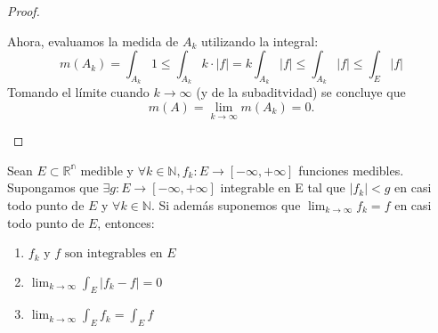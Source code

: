 \begin{proof}
\begin{enumerate}
              Ahora, evaluamos la medida de $ A_k $ utilizando la integral: $$ m(A_k) =
                  \int_{A_k} 1 \leq \int_{A_k} k \cdot |f| = k \int_{A_k} |f| \leq \int_{A_k} |f|
                  \leq \int_E |f|$$ Tomando el límite cuando $ k \to \infty $ (y de la
              subaditvidad) se concluye que $$ m(A) = \lim_{k \to \infty} m(A_k) = 0. $$
    \end{enumerate}
\end{proof}
\begin{teorema}
    Sean $E \subset \mathbb{R^n}$ medible y $\forall k \in \mathbb{N}, f_k: E \to [-\infty, +\infty]$ funciones medibles. Supongamos que $\exists g: E \to [-\infty, +\infty]$ integrable en E tal que $|f_k| < g$ en casi todo punto de $E$ y $\forall k \in \mathbb{N}$. Si además suponemos que $\lim_{k \to \infty} f_k = f$ en casi todo punto de $E$, entonces:
    \begin{enumerate}
        \item $f_k \text{ y } f \text{ son integrables en }E$
        \item $\lim_{k \to \infty} \int_{E} |f_k - f| = 0$
        \item $\lim_{k \to \infty} \int_{E} f_k = \int_{E} f$
    \end{enumerate}
\end{teorema}
